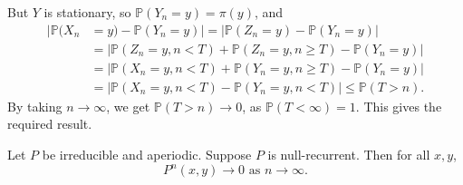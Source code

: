 \documentclass[12pt]{article}
\begin{document}
\begin{proofbox}
	But $Y$ is stationary, so $\mathbb{P}(Y_n = y) = \pi(y)$, and
	\begin{align*}
		|\mathbb{P}(X_n &= y) - \mathbb{P}(Y_n = y)| = |\mathbb{P}(Z_n = y) - \mathbb{P}(Y_n = y)| \\
				&= |\mathbb{P}(Z_n = y, n < T) + \mathbb{P}(Z_n = y, n \geq T) - \mathbb{P}(Y_n = y)| \\
				&= |\mathbb{P}(X_n = y, n < T) + \mathbb{P}(Y_n = y, n \geq T) - \mathbb{P}(Y_n = y)| \\
				&= |\mathbb{P}(X_n = y, n < T) - \mathbb{P}(Y_n = y, n < T)| \leq \mathbb{P}(T > n).
	\end{align*}
	By taking $n \to \infty$, we get $\mathbb{P}(T > n) \to 0$, as $\mathbb{P}(T < \infty) = 1$. This gives the required result.
\end{proofbox}

\begin{theorem}
	Let $P$ be irreducible and aperiodic. Suppose $P$ is null-recurrent. Then for all $x, y$,
	\[
		P^{n}(x, y) \to 0 \text{ as } n \to \infty
	.\]
\end{theorem}
\end{document}
